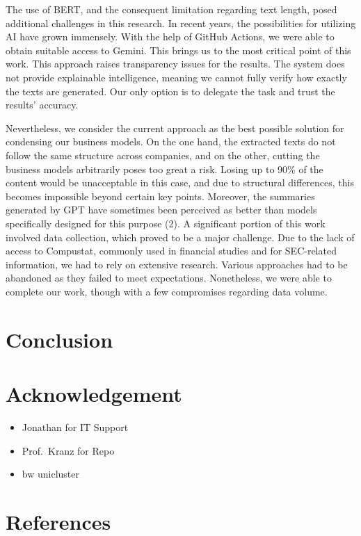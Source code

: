 \documentclass[
]{article}
\providecommand{\tightlist}{%
  \setlength{\itemsep}{0pt}\setlength{\parskip}{0pt}}\usepackage{longtable,booktabs,array}
\begin{document}
The use of BERT, and the consequent limitation regarding text length,
posed additional challenges in this research. In recent years, the
possibilities for utilizing AI have grown immensely. With the help of
GitHub Actions, we were able to obtain suitable access to Gemini. This
brings us to the most critical point of this work. This approach raises
transparency issues for the results. The system does not provide
explainable intelligence, meaning we cannot fully verify how exactly the
texts are generated. Our only option is to delegate the task and trust
the results' accuracy.

Nevertheless, we consider the current approach as the best possible
solution for condensing our business models. On the one hand, the
extracted texts do not follow the same structure across companies, and
on the other, cutting the business models arbitrarily poses too great a
risk. Losing up to 90\% of the content would be unacceptable in this
case, and due to structural differences, this becomes impossible beyond
certain key points. Moreover, the summaries generated by GPT have
sometimes been perceived as better than models specifically designed for
this purpose (2). A significant portion of this work involved data
collection, which proved to be a major challenge. Due to the lack of
access to Compustat, commonly used in financial studies and for
SEC-related information, we had to rely on extensive research. Various
approaches had to be abandoned as they failed to meet expectations.
Nonetheless, we were able to complete our work, though with a few
compromises regarding data volume.

\section{Conclusion}\label{conclusion}

\section{Acknowledgement}\label{acknowledgement}

\begin{itemize}
\tightlist
\item
  Jonathan for IT Support
\item
  Prof.~Kranz for Repo
\item
  bw unicluster
\end{itemize}

\newpage{}

\section{References}\label{references}
\end{document}
